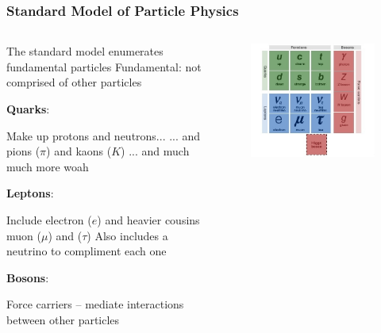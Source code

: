 \documentclass[10pt,professionalfonts,xcolor=table]{beamer}
\begin{document}
\frame
{
  \frametitle{Standard Model of Particle Physics}

\begin{columns}[c]
  \begin{itemize}
  \bang The standard model enumerates fundamental particles
  \bang Fundamental: not comprised of other particles

  \bang \textbf{Quarks}:
    \begin{itemize}
    \bing Make up protons and neutrons...
    \bong ... and pions ($\pi$) and kaons ($K$)
    \bong ... and much much more woah

    \end{itemize}
  \bang \textbf{Leptons}:
    \begin{itemize}
    \bing Include electron ($e$) and heavier cousins muon ($\mu$) and ($\tau$)
    \bing Also includes a neutrino to compliment each one
    \end{itemize}
  \bang \textbf{Bosons}:
    \begin{itemize}
    \bing Force carriers -- mediate interactions between other particles
    \end{itemize}

  \end{itemize}
    \begin{figure}
  \includegraphics[width=\textwidth]{figures/figures/stdmod.jpg}
  \end{figure}
\end{columns}

}
\end{document}
